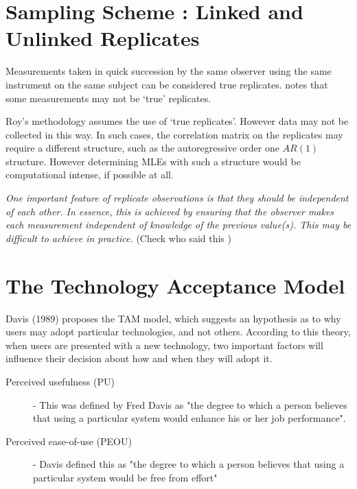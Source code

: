 \documentclass[12pt, a4paper]{report}
\theoremstyle{plain}
\theoremstyle{definition}
\theoremstyle{remark}
\begin{document}
	
	\section{Sampling Scheme : Linked and Unlinked Replicates}
	Measurements taken in quick succession by the same observer using the same instrument on the same subject can be considered true replicates. \citet{ARoy2009} notes that some measurements may not be `true' replicates.
	
	Roy's methodology assumes the use of `true replicates'. However data may not be collected in this way. In such cases, the correlation matrix on the replicates may require a different structure, such as the autoregressive order one $AR(1)$ structure. However determining MLEs with such a structure would be computational intense, if possible at all.
	
	
	
	\emph{
		One important feature of replicate observations is that they should be independent
		of each other. In essence, this is achieved by ensuring that the observer makes each
		measurement independent of knowledge of the previous value(s). This may be difficult
		to achieve in practice.} (Check who said this
	)
	
	

	\section{The Technology Acceptance Model}
	Davis (1989) proposes the TAM model, which suggests an hypothesis as to why users may adopt particular technologies, and not others. 
	According to this theory, when users are presented with a new 
	technology, two important factors will influence their decision about how and when they will adopt it.
	\begin{description}
		\item[Perceived usefulness (PU)] - This was defined by Fred Davis as "the degree to which a person believes that using a particular system would enhance his or her job performance".
		\item[Perceived ease-of-use (PEOU)] - Davis defined this as "the degree to which a person believes that using a particular system would be free from effort" 
	\end{description}
	
\end{document}
